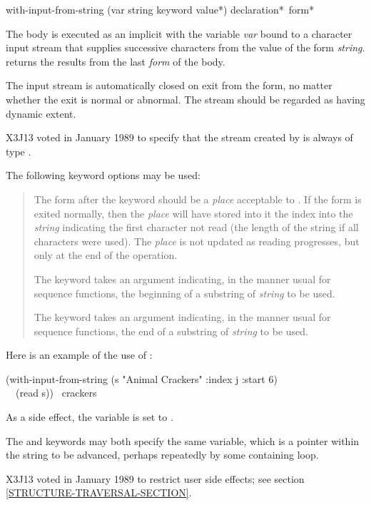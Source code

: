 \begin{defmac}
with-input-from-string (var string {keyword value}*)
      {declaration}* {\,form}*

The body is executed as an implicit  with the variable {\it var}
bound to a character input stream that supplies successive characters from
the value of the form {\it string}.  
returns the results from the last {\it form} of the body.

The input stream is automatically closed on exit from
the  form,
no matter whether the exit is normal or abnormal.
The stream should be regarded as having dynamic extent.

\begin{new}
X3J13 voted in January 1989
to specify that the stream created by
 is always of type .
\end{new}

The following keyword options may be used:
\begin{quotation}
\begin{flushdesc}
\item[\cd{:index}]
The form after the  keyword should be a {\it place}
acceptable to .  If the  form
is exited normally, then the {\it place} will have stored into it the
index into the {\it string} indicating the first character not read
(the length of the string if all characters were used).
The {\it place} is not updated as reading progresses, but only at the
end of the operation. 

\item[\cd{:start}]
The  keyword takes an argument indicating, in the manner
usual for sequence functions, the beginning of
a substring of {\it string} to be used.

\item[\cd{:end}]
The  keyword takes an argument indicating, in the manner
usual for sequence functions, the end of
a substring of {\it string} to be used.
\end{flushdesc}
\end{quotation}

Here is an example of the use of :
\begin{lisp}
(with-input-from-string (s "Animal Crackers" :index j :start 6) \\
~~(read s)) \EV\ crackers
\end{lisp}
As a side effect, the variable  is set to .

The  and  keywords may both specify
the same variable, which is a pointer within the string to be advanced,
perhaps repeatedly by some containing loop.

\begin{new}
X3J13 voted in January 1989
to restrict user side effects; see section \ref{STRUCTURE-TRAVERSAL-SECTION}.
\end{new}
\end{defmac}

